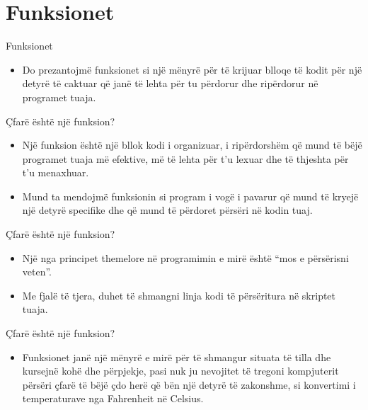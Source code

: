 \documentclass[
  ignorenonframetext,
]{beamer}
\providecommand{\tightlist}{%
  \setlength{\itemsep}{0pt}\setlength{\parskip}{0pt}}
\begin{document}
\hypertarget{funksionet}{%
\section{Funksionet}\label{funksionet}}

\begin{frame}{Funksionet}
\protect\hypertarget{funksionet-1}{}
\begin{itemize}
\tightlist
\item
  Do prezantojmë funksionet si një mënyrë për të krijuar blloqe të kodit
  për një detyrë të caktuar që janë të lehta për tu përdorur dhe
  ripërdorur në programet tuaja.
\end{itemize}
\end{frame}

\begin{frame}{Çfarë është një funksion?}
\protect\hypertarget{uxe7faruxeb-uxebshtuxeb-njuxeb-funksion}{}
\begin{itemize}
\item
  Një funksion është një bllok kodi i organizuar, i ripërdorshëm që mund
  të bëjë programet tuaja më efektive, më të lehta për t'u lexuar dhe të
  thjeshta për t'u menaxhuar.
\item
  Mund ta mendojmë funksionin si program i vogë i pavarur që mund të
  kryejë një detyrë specifike dhe që mund të përdoret përsëri në kodin
  tuaj.
\end{itemize}
\end{frame}

\begin{frame}{Çfarë është një funksion?}
\protect\hypertarget{uxe7faruxeb-uxebshtuxeb-njuxeb-funksion-1}{}
\begin{itemize}
\item
  Një nga principet themelore në programimin e mirë është ``mos e
  përsërisni veten''.
\item
  Me fjalë të tjera, duhet të shmangni linja kodi të përsëritura në
  skriptet tuaja.
\end{itemize}
\end{frame}

\begin{frame}{Çfarë është një funksion?}
\protect\hypertarget{uxe7faruxeb-uxebshtuxeb-njuxeb-funksion-2}{}
\begin{itemize}
\tightlist
\item
  Funksionet janë një mënyrë e mirë për të shmangur situata të tilla dhe
  kursejnë kohë dhe përpjekje, pasi nuk ju nevojitet të tregoni
  kompjuterit përsëri çfarë të bëjë çdo herë që bën një detyrë të
  zakonshme, si konvertimi i temperaturave nga Fahrenheit në Celsius.
\end{itemize}
\end{frame}
\end{document}
